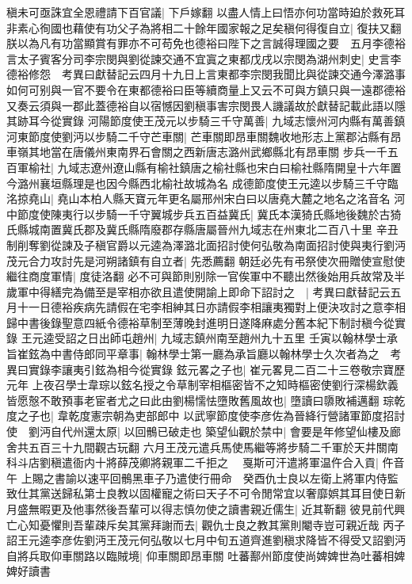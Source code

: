 稹未可亟誅宜全恩禮請下百官議|{
	下戶嫁翻}
以盡人情上曰悟亦何功當時廹於救死耳非素心徇國也藉使有功父子為將相二十餘年國家報之足矣稹何得復自立|{
	復扶又翻}
朕以為凡有功當顯賞有罪亦不可苟免也德裕曰陛下之言誠得理國之要　五月李德裕言太子賓客分司李宗閔與劉從諫交通不宜寘之東都戊戌以宗閔為湖州刺史|{
	史言李德裕修怨　考異曰獻替記云四月十九日上言東都李宗閔我聞比與從諫交通今澤潞事如何可别與一官不要令在東都德裕曰臣等續商量上又云不可與方鎮只與一遠郡德裕又奏云須與一郡此蓋德裕自以宿憾因劉稹事害宗閔畏人譏議故於獻替記載此語以隱其跡耳今從實錄}
河陽節度使王茂元以步騎三千守萬善|{
	九域志懷州河内縣有萬善鎮}
河東節度使劉沔以步騎二千守芒車關|{
	芒車關即昂車關魏收地形志上黨郡沾縣有昂車嶺其地當在唐儀州東南界石會關之西新唐志潞州武鄉縣北有昂車關}
步兵一千五百軍榆社|{
	九域志遼州遼山縣有榆社鎮唐之榆社縣也宋白曰榆社縣隋開皇十六年置今潞州襄垣縣理是也因今縣西北榆社故城為名}
成德節度使王元逵以步騎三千守臨洺掠堯山|{
	堯山本柏人縣天寶元年更名屬邢州宋白曰以唐堯大麓之地名之洺音名}
河中節度使陳夷行以步騎一千守翼城步兵五百益冀氏|{
	冀氏本漢猗氏縣地後魏於古猗氏縣城南置冀氏郡及冀氏縣隋廢郡存縣唐屬晉州九域志在州東北二百八十里}
辛丑制削奪劉從諫及子稹官爵以元逵為澤潞北面招討使何弘敬為南面招討使與夷行劉沔茂元合力攻討先是河朔諸鎮有自立者|{
	先悉薦翻}
朝廷必先有弔祭使次冊贈使宣慰使繼往商度軍情|{
	度徒洛翻}
必不可與節則别除一官俟軍中不聽出然後始用兵故常及半歲軍中得繕完為備至是宰相亦欲且遣使開諭上即命下詔討之　|{
	考異曰獻替記云五月十一日德裕疾病先請假在宅李相紳其日亦請假李相讓夷獨對上便決攻討之意李相歸中書後錄聖意四紙令德裕草制至薄晚封進明日遂降麻處分舊本紀下制討稹今從實錄}
王元逵受詔之日出師屯趙州|{
	九域志鎮州南至趙州九十五里}
壬寅以翰林學士承旨崔鉉為中書侍郎同平章事|{
	翰林學士第一廳為承旨廳以翰林學士久次者為之　考異曰實錄李讓夷引鉉為相今從實錄}
鉉元畧之子也|{
	崔元畧見二百二十三卷敬宗寶歷元年}
上夜召學士韋琮以鉉名授之令草制宰相樞密皆不之知時樞密使劉行深楊欽義皆愿慤不敢預事老宦者尤之曰此由劉楊懦怯墮敗舊風故也|{
	墮讀曰隳敗補邁翻}
琮乾度之子也|{
	韋乾度憲宗朝為吏部郎中}
以武寧節度使李彦佐為晉絳行營諸軍節度招討使　劉沔自代州還太原|{
	以回鶻已破走也}
築望仙觀於禁中|{
	會要是年修望仙樓及廊舍共五百三十九間觀古玩翻}
六月王茂元遣兵馬使馬繼等將步騎二千軍於天井關南科斗店劉稹遣衙内十將薛茂卿將親軍二千拒之　戛斯可汗遣將軍温仵合入貢|{
	仵音午}
上賜之書諭以速平回鶻黑車子乃遣使行冊命　癸酉仇士良以左衛上將軍内侍監致仕其黨送歸私第士良教以固權寵之術曰天子不可令閒常宜以奢靡娯其耳目使日新月盛無暇更及他事然後吾輩可以得志慎勿使之讀書親近儒生|{
	近其靳翻}
彼見前代興亡心知憂懼則吾輩疎斥矣其黨拜謝而去|{
	觀仇士良之教其黨則閹寺豈可親近哉}
丙子詔王元逵李彦佐劉沔王茂元何弘敬以七月中旬五道齊進劉稹求降皆不得受又詔劉沔自將兵取仰車關路以臨賊境|{
	仰車關即昂車關}
吐蕃鄯州節度使尚婢婢世為吐蕃相婢婢好讀書

